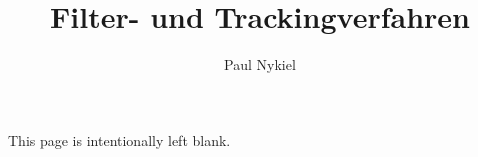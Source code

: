 \documentclass[10pt]{report}
\title{Filter- und Trackingverfahren}
\author{Paul Nykiel}
\begin{document}
    \maketitle
    \pagebreak
    This page is intentionally left blank.
    \pagebreak
    \tableofcontents
    \pagebreak
    
    
    
    
    
    
    
    
    
\end{document}

